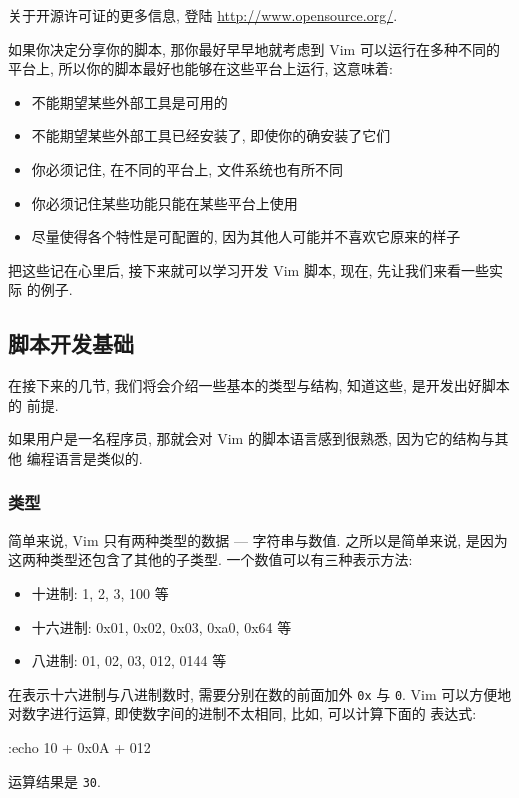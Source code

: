 \begin{warning}
    关于开源许可证的更多信息, 登陆 \url{http://www.opensource.org/}.
\end{warning}

如果你决定分享你的脚本, 那你最好早早地就考虑到 Vim 可以运行在多种不同的平台上,
所以你的脚本最好也能够在这些平台上运行, 这意味着:
\begin{itemize}
    \item 不能期望某些外部工具是可用的
    \item 不能期望某些外部工具已经安装了, 即使你的确安装了它们
    \item 你必须记住, 在不同的平台上, 文件系统也有所不同
    \item 你必须记住某些功能只能在某些平台上使用
    \item 尽量使得各个特性是可配置的, 因为其他人可能并不喜欢它原来的样子
\end{itemize}

把这些记在心里后, 接下来就可以学习开发 Vim 脚本, 现在, 先让我们来看一些实际
的例子.

\subsection{脚本开发基础}
\label{subsec:script_writing_basics}

在接下来的几节, 我们将会介绍一些基本的类型与结构, 知道这些, 是开发出好脚本的
前提.

如果用户是一名程序员, 那就会对 Vim 的脚本语言感到很熟悉, 因为它的结构与其他
编程语言是类似的.

\subsubsection{类型}
\label{subsubsec:types}

简单来说, Vim 只有两种类型的数据 --- 字符串与数值. 之所以是简单来说, 是因为
这两种类型还包含了其他的子类型. 一个数值可以有三种表示方法:
\begin{itemize}
    \item 十进制: 1, 2, 3, 100 等
    \item 十六进制: 0x01, 0x02, 0x03, 0xa0, 0x64 等
    \item 八进制: 01, 02, 03, 012, 0144 等
\end{itemize}

在表示十六进制与八进制数时, 需要分别在数的前面加外 \texttt{0x} 与 \texttt{0}.
Vim 可以方便地对数字进行运算, 即使数字间的进制不太相同, 比如, 可以计算下面的
表达式:
\begin{vimcode}
:echo 10 + 0x0A + 012
\end{vimcode}
运算结果是 \texttt{30}.

